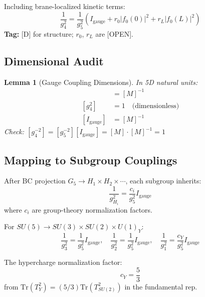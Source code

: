 \documentclass[11pt,a4paper]{article}
\newtheorem{lemma}[theorem]{Lemma}
\begin{document}
Including brane-localized kinetic terms:
\begin{equation}
  \frac{1}{g_4^2} = \frac{1}{g_5^2}\left( I_{\text{gauge}}
    + r_0 |f_0(0)|^2 + r_L |f_0(L)|^2 \right)
  \label{eq:gauge-bridge-brane}
\end{equation}
\textbf{Tag:} [D] for structure; $r_0$, $r_L$ are [OPEN].

\subsection{Dimensional Audit}

\begin{lemma}[Gauge Coupling Dimensions]
\label{lem:gauge-dimensions}
In 5D natural units:
\begin{align}
  [g_5^2] &= [M]^{-1}
  \label{eq:dim-g5} \\
  [g_4^2] &= 1 \quad \text{(dimensionless)}
  \label{eq:dim-g4} \\
  [I_{\text{gauge}}] &= [M]^{-1}
  \label{eq:dim-igauge}
\end{align}
Check: $[g_4^{-2}] = [g_5^{-2}][I_{\text{gauge}}] = [M] \cdot [M]^{-1} = 1$ \checkmark
\end{lemma}

\subsection{Mapping to Subgroup Couplings}

After BC projection $G_5 \to H_1 \times H_2 \times \cdots$, each subgroup inherits:
\begin{equation}
  \frac{1}{g_{H_i}^2} = \frac{c_i}{g_5^2} I_{\text{gauge}}
  \label{eq:subgroup-coupling}
\end{equation}
where $c_i$ are group-theory normalization factors.

For $SU(5) \to SU(3) \times SU(2) \times U(1)_Y$:
\begin{equation}
  \frac{1}{g_3^2} = \frac{1}{g_5^2} I_{\text{gauge}}, \quad
  \frac{1}{g_2^2} = \frac{1}{g_5^2} I_{\text{gauge}}, \quad
  \frac{1}{g_1^2} = \frac{c_Y}{g_5^2} I_{\text{gauge}}
  \label{eq:su5-couplings}
\end{equation}

The hypercharge normalization factor:
\begin{equation}
  \boxed{c_Y = \frac{5}{3}}
  \label{eq:hypercharge-norm}
\end{equation}
from $\text{Tr}(T_Y^2) = (5/3) \text{Tr}(T_{SU(2)}^2)$ in the fundamental rep.
\end{document}
